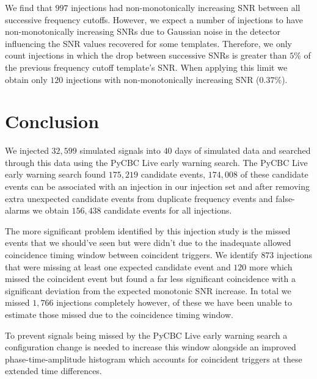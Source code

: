 We find that $997$ injections had non-monotonically increasing SNR between all successive frequency cutoffs. However, we expect a number of injections to have non-monotonically increasing SNRs due to Gaussian noise in the detector influencing the SNR values recovered for some templates. Therefore, we only count injections in which the drop between successive SNRs is greater than $5\%$ of the previous frequency cutoff template's SNR. When applying this limit we obtain only $120$ injections with non-monotonically increasing SNR ($0.37\%$).




\section{\label{6:sec:conclusion}Conclusion}

We injected $32,599$ simulated \gwadj signals into $40$ days of simulated \gwadj data and searched through this data using the PyCBC Live early warning search. The PyCBC Live early warning search found $175,219$ candidate events, $174,008$ of these candidate events can be associated with an injection in our injection set and after removing extra unexpected candidate events from duplicate frequency events and false-alarms we obtain $156,438$ candidate events for all injections.

The more significant problem identified by this injection study is the missed events that we should've seen but were didn't due to the inadequate allowed coincidence timing window between coincident triggers. We identify $873$ injections that were missing at least one expected candidate event and $120$ more which missed the coincident event but found a far less significant coincidence with a significant deviation from the expected monotonic SNR increase. In total we missed $1,766$ injections completely however, of these we have been unable to estimate those missed due to the coincidence timing window.

To prevent \gwadj signals being missed by the PyCBC Live early warning search a configuration change is needed to increase this window alongside an improved phase-time-amplitude histogram which accounts for coincident \gwadj triggers at these extended time differences. 

